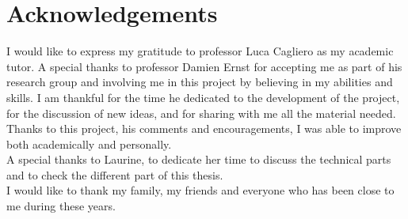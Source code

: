 
\chapter*{Acknowledgements}
\thispagestyle{empty}

\vspace*{5\baselineskip}

I would like to express my gratitude to professor Luca Cagliero as my academic tutor. A special thanks to professor Damien Ernst for accepting me as part of his research group and involving me in this project by believing in my abilities and skills. I am thankful for the time he dedicated to the development of the project, for the discussion of new ideas, and for sharing with me all the material needed. Thanks to this project, his comments and encouragements, I was able to improve both academically and personally.\\
A special thanks to Laurine, to dedicate her time to discuss the technical parts and to check the different part of this thesis.\\

I would like to thank my family, my friends and everyone who has been close to me during these years.


\paginavuota




